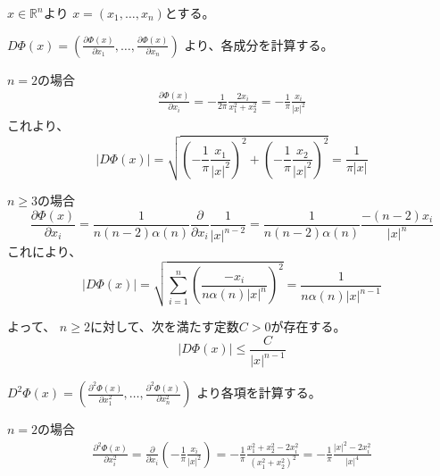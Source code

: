 \documentclass[12pt,b5paper]{ltjsarticle}
\begin{document}
$x\in\mathbb{R}^n$より
$x=(x_{1},\dots,x_{n})$とする。

$\displaystyle D\Phi(x)=
\left(\frac{\partial \Phi(x)}{\partial x_{1}},\dots,\frac{\partial \Phi(x)}{\partial x_{n}}\right)$
より、各成分を計算する。

$n=2$の場合
\begin{gather}
 \frac{\partial \Phi(x)}{\partial x_{i}}
  = -\frac{1}{2\pi} \frac{2x_{i}}{x_{1}^{2}+x_{2}^{2}}
  = -\frac{1}{\pi} \frac{x_{i}}{\lvert x \rvert^2} %
\end{gather}
これより、
\begin{equation}
 \lvert D\Phi(x)\rvert
  = \sqrt{\left( -\frac{1}{\pi} \frac{x_{1}}{\lvert x \rvert^2} \right)^2
  + \left( -\frac{1}{\pi} \frac{x_{2}}{\lvert x \rvert^2} \right)^2}
  = \frac{1}{\pi\lvert x \rvert}
\end{equation}

$n\geq 3$の場合
\begin{equation}
 \frac{\partial \Phi(x)}{\partial x_{i}}
  =\frac{1}{n(n-2)\alpha(n)} \frac{\partial}{\partial x_{i}} \frac{1}{\lvert x \rvert^{n-2}}
  = \frac{1}{n(n-2)\alpha(n)} \frac{-(n-2)x_{i}}{\lvert x \rvert^{n}}
\end{equation}
これにより、
\begin{equation}
 \lvert D\Phi(x)\rvert
  = \sqrt{\sum_{i=1}^{n} \left( \frac{-x_{i}}{n\alpha(n)\lvert x \rvert^{n}} \right)^2}
  = \frac{1}{n\alpha(n)\lvert x \rvert^{n-1}}
\end{equation}

よって、
$n\geq2$に対して、次を満たす定数$C>0$が存在する。
\begin{equation}
 \lvert D\Phi(x)\rvert
  \leq \frac{C}{\lvert x \rvert^{n-1}}
\end{equation}

\dotfill

$\displaystyle D^2 \Phi(x)=
\left(\frac{\partial^2 \Phi(x)}{\partial x_{1}^2},\dots,\frac{\partial^2 \Phi(x)}{\partial x_{n}^2}\right)$
より各項を計算する。

$n=2$の場合
\begin{gather}
 \frac{\partial^2 \Phi(x)}{\partial x_{i}^2}
  = \frac{\partial}{\partial x_{i}}
    \left( -\frac{1}{\pi} \frac{x_{i}}{\lvert x \rvert^2} \right)
  = -\frac{1}{\pi} \frac{x_{1}^2+x_{2}^{2} -2x_{i}^2}{(x_{1}^{2}+x_{2}^{2})^2}
  = -\frac{1}{\pi} \frac{\lvert x \rvert^{2} -2x_{i}^2}{\lvert x \rvert^4}
\end{gather}
\end{document}
